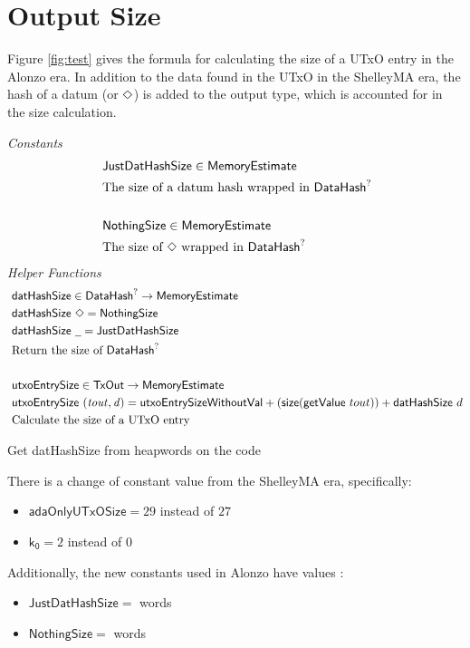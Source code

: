 \section{Output Size}
\label{sec:value-size}

Figure \ref{fig:test} gives the formula for calculating the size of a UTxO entry
in the Alonzo era. In addition to the data found in the UTxO in the ShelleyMA
era, the hash of a datum (or $\Diamond$) is added to the output type, which
is accounted for in the size calculation.

\begin{figure*}[h]
  \emph{Constants}
  \begin{align*}
  & \mathsf{JustDatHashSize} \in \mathsf{MemoryEstimate} \\
  & \text{The size of a datum hash wrapped in $\mathsf{DataHash}^?$} \\~
  \\
  & \mathsf{NothingSize} \in \mathsf{MemoryEstimate} \\
  & \text{The size of $\Diamond$ wrapped in $\mathsf{DataHash}^?$}
  \end{align*}
  \emph{Helper Functions}
  \begin{align*}
    & \fun{datHashSize} \in \DataHash^? \to \MemoryEstimate \\
    & \fun{datHashSize}~ \Nothing = \mathsf{NothingSize} \\
    & \fun{datHashSize}~ \wcard = \mathsf{JustDatHashSize} \\
    & \text{Return the size of $\DataHash^?$} \\~\\
    & \fun{utxoEntrySize} \in \TxOut \to \MemoryEstimate \\
    & \fun{utxoEntrySize}~\var{(tout, d)} = \mathsf{utxoEntrySizeWithoutVal} + (\fun{size} (\fun{getValue}~tout)) + \mathsf{datHashSize}~d \\
    & \text{Calculate the size of a UTxO entry}
  \end{align*}
  \caption{Value Size}
  \label{fig:test}
\end{figure*}

\begin{note}
  Get datHashSize from heapwords on the code
\end{note}

There is a change of constant value from the ShelleyMA era, specifically:

\begin{itemize}
  \item $\mathsf{adaOnlyUTxOSize} = 29$ instead of $27$
  \item $\mathsf{k_0} = 2$ instead of $0$
\end{itemize}

Additionally, the new constants used in Alonzo have values :

\begin{itemize}
  \item $\mathsf{JustDatHashSize} = $ words
  \item $\mathsf{NothingSize} = $ words
\end{itemize}
